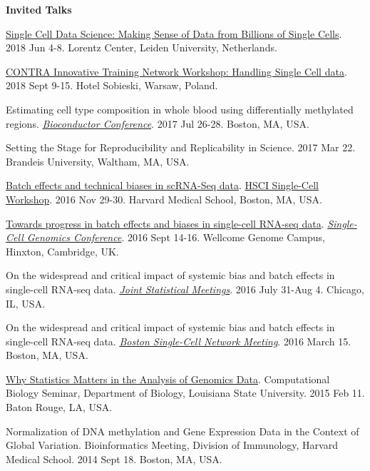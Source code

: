 \documentclass[10pt]{article}
\begin{document}
\textbf{Invited Talks} 
\begin{enumerate}[label= {[\arabic*]}, labelwidth=15pt]
\item \href{http://lorentzcenter.nl/lc/web/2018/986/info.php3?wsid=986&venue=Oort}{Single Cell Data Science: Making Sense of Data from Billions of Single Cells}. 2018 Jun 4-8. Lorentz Center, Leiden University, Netherlands. 
\item \href{https://www.mimuw.edu.pl/~szczurek/SingleCellContraITN}{CONTRA Innovative Training Network Workshop: Handling Single Cell data}. 2018 Sept 9-15. Hotel Sobieski, Warsaw, Poland. 
	\item Estimating cell type composition in whole blood using differentially methylated regions. \href{http://bioconductor.org/help/course-materials/2017/BioC2017/}{{\it Bioconductor Conference}}. 2017 Jul 26-28. Boston, MA, USA.  
        \item Setting the Stage for Reproducibility and Replicability in Science. 2017 Mar 22. Brandeis University, Waltham, MA, USA.
	\item \href{https://github.com/hms-dbmi/scw/tree/master/scw2016/tutorials/batcheffects}{Batch effects and technical biases in scRNA-Seq data}. \href{http://hsci.harvard.edu/event/save-date-single-cell-analysis-workshop}{HSCI Single-Cell Workshop}. 2016 Nov 29-30. Harvard Medical School, Boston, MA, USA.  
	\item \href{https://speakerdeck.com/stephaniehicks/towards-progress-in-batch-effects-and-biases-in-single-cell-rna-seq-data}{Towards progress in batch effects and biases in single-cell RNA-seq data}. \href{https://coursesandconferences.wellcomegenomecampus.org/events/item.aspx?e=596}{{\it Single-Cell Genomics Conference}}. 2016 Sept 14-16. Wellcome Genome Campus, Hinxton, Cambridge, UK.
	\item On the widespread and critical impact of systemic bias and batch effects in single-cell RNA-seq data. \href{https://www.amstat.org/meetings/jsm/2016/onlineprogram/MainSearchResults.cfm}{{\it Joint Statistical Meetings}}. 2016 July 31-Aug 4. Chicago, IL, USA. 
	\item On the widespread and critical impact of systemic bias and batch effects in single-cell RNA-seq data. \href{http://hsci.harvard.edu/event/widespread-and-critical-impact-systemic-bias-and-batch-effects-single-cell-rna-seq-data?delta=0}{{\it Boston Single-Cell Network Meeting}}. 2016 March 15. Boston, MA, USA. 
	\item \href{https://speakerdeck.com/stephaniehicks/why-statistics-matters-in-the-analysis-of-genomics-data}{Why Statistics Matters in the Analysis of Genomics Data}. Computational Biology Seminar, Department of Biology, Louisiana State University. 2015 Feb 11. Baton Rouge, LA, USA.  
	\item Normalization of DNA methylation and Gene Expression Data in the Context of Global Variation.  Bioinformatics Meeting, Division of Immunology, Harvard Medical School. 2014 Sept 18. Boston, MA, USA. 
\end{enumerate}
\end{document}
